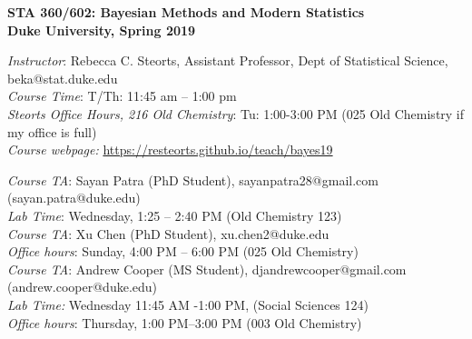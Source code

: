 \documentclass[11pt]{article}
\date{}
\begin{document}
\begin{center}
{\Large\bf STA 360/602: Bayesian Methods and Modern Statistics} \\

{\Large\bf Duke University, Spring 2019} \\
\end{center}

\emph{Instructor}: Rebecca C. Steorts,  Assistant Professor, Dept of Statistical Science, beka@stat.duke.edu\\
\emph{Course Time}: T/Th: 11:45 am -- 1:00 pm\\
\emph{Steorts Office Hours, 216 Old Chemistry}: Tu: 1:00-3:00 PM (025 Old Chemistry if my office is full) \\
\emph{Course webpage:} \url{https://resteorts.github.io/teach/bayes19} \\
\vspace*{1em}

\emph{Course TA}: Sayan Patra (PhD Student), sayanpatra28@gmail.com (sayan.patra@duke.edu) \\
\emph{Lab Time}: Wednesday, 1:25 -- 2:40 PM (Old Chemistry 123) \\


\emph{Course TA}: Xu Chen (PhD Student), xu.chen2@duke.edu \\
\emph{Office hours}: Sunday, 4:00 PM -- 6:00 PM (025 Old Chemistry)\\

\emph{Course TA}:  Andrew Cooper (MS Student), djandrewcooper@gmail.com (andrew.cooper@duke.edu)\\
\emph{Lab Time:} Wednesday 11:45 AM -1:00 PM, (Social Sciences 124)\\
\emph{Office hours}: Thursday, 1:00 PM--3:00 PM (003 Old Chemistry)\\
\vspace*{1em}

\end{document}
